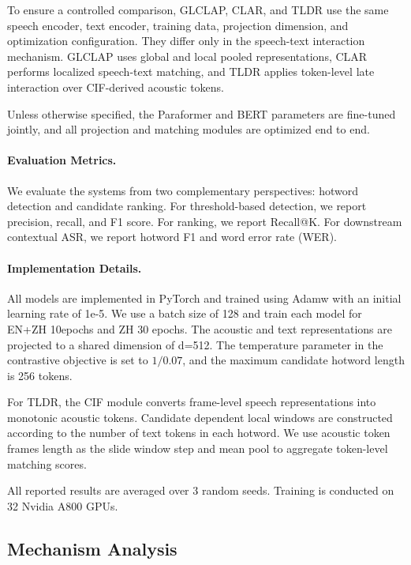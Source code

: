 \documentclass[letterpaper]{article} %
\begin{document}
To ensure a controlled comparison, GLCLAP, CLAR, and TLDR use the same speech encoder, text encoder, training data, projection dimension, and optimization configuration. They differ only in the speech-text interaction mechanism. GLCLAP uses global and local pooled representations, CLAR performs localized speech-text matching, and TLDR applies token-level late interaction over CIF-derived acoustic tokens.

Unless otherwise specified, the Paraformer and BERT parameters are fine-tuned jointly, and all projection and matching modules are optimized end to end.

\paragraph{Evaluation Metrics.}
We evaluate the systems from two complementary perspectives: hotword detection and candidate ranking. For threshold-based detection, we report precision, recall, and F1 score. For ranking, we report Recall@K. For downstream contextual ASR, we report hotword F1 and word error rate (WER).

\paragraph{Implementation Details.}
All models are implemented in PyTorch and trained using Adamw with an initial learning rate of 1e-5. We use a batch size of 128 and train each model for EN+ZH 10epochs and ZH 30 epochs. The acoustic and text representations are projected to a shared dimension of d=512. The temperature parameter in the contrastive objective is set to $1 / 0.07$, and the maximum candidate hotword length is 256 tokens.

For TLDR, the CIF module converts frame-level speech representations into monotonic acoustic tokens. Candidate dependent local windows are constructed according to the number of text tokens in each hotword. We use acoustic token frames length as the slide window step and mean pool to aggregate token-level matching scores.

All reported results are averaged over 3 random seeds.  Training is conducted on 32 Nvidia A800 GPUs.




\subsection{Mechanism Analysis}
\end{document}
